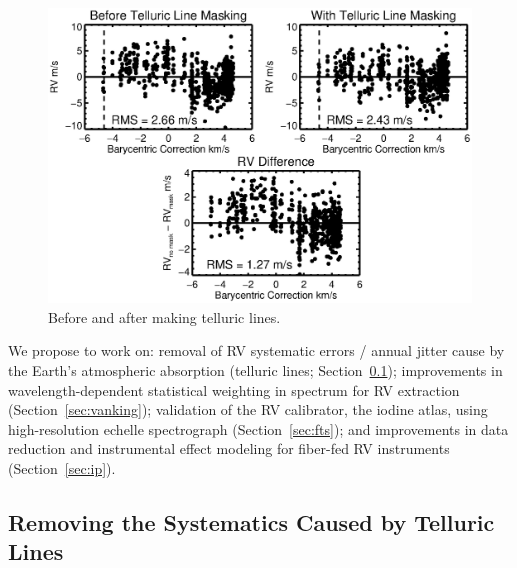 \documentclass[12pt]{article}
\begin{document}
\begin{figure}[thb]
  \vspace{-5pt}
  \begin{center}
    \includegraphics[width=\textwidth]{telluric}
  \end{center}
  \vspace{-25pt}  
  \caption{Before and after making telluric lines.}
  \vspace{-8pt}  
  \label{tell}
\end{figure}

We propose to work on: removal of RV systematic errors / annual jitter
cause by the Earth's atmospheric absorption (telluric lines;
Section~\ref{sec:tell}); improvements in wavelength-dependent
statistical weighting in spectrum for RV extraction
(Section~\ref{sec:vanking}); validation of the RV calibrator, the
iodine atlas, using high-resolution echelle spectrograph
(Section~\ref{sec:fts}); and improvements in data reduction and
instrumental effect modeling for fiber-fed RV instruments
(Section~\ref{sec:ip}). 

\vspace{-3pt}
\subsection{Removing the Systematics Caused by Telluric
  Lines}\label{sec:tell}


\vspace{-3pt}
\end{document}
